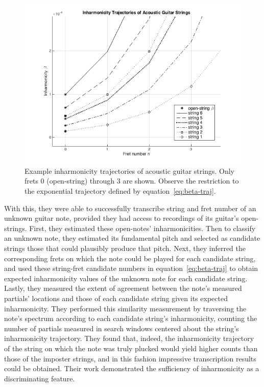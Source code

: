 \documentclass[12pt]{cmuthesis}
\begin{document}
\begin{figure}[h] 
\label{fig:beta-trajectories-ag}
\centering
\includegraphics[scale=0.70]{beta-trajectories-ag}
\caption{Example inharmonicity trajectories of acoustic guitar strings. Only frets 0 (open-string) through 3 are shown. Observe the restriction to the exponential trajectory defined by equation~\eqref{eq:beta-traj}.}
\end{figure}

With this, they were able to successfully transcribe string and fret number of an unknown guitar note, provided they had access to recordings of its guitar's open-strings. First, they estimated these open-notes' inharmonicities. Then to classify an unknown note, they estimated its fundamental pitch and selected as candidate strings those that could plausibly produce that pitch. Next, they inferred the corresponding frets on which the note could be played for each candidate string, and used these string-fret candidate numbers in equation~\eqref{eq:beta-traj} to obtain expected inharmonicity values of the unknown note for each candidate string. Lastly, they measured the extent of agreement between the note's measured partials' locations and those of each candidate string given its expected inharmonicity. They performed this similarity measurement by traversing the note's spectrum according to each candidate string's inharmonicity, counting the number of partials measured in search windows centered about the string's inharmonicity trajectory. They found that, indeed, the inharmonicity trajectory of the string on which the note was truly plucked would yield higher counts than those of the imposter strings, and in this fashion impressive transcription results could be obtained. Their work demonstrated the sufficiency of inharmonicity as a discriminating feature.
\end{document}
